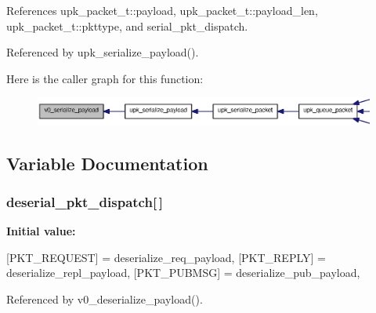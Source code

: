 References upk\_\-packet\_\-t::payload, upk\_\-packet\_\-t::payload\_\-len, upk\_\-packet\_\-t::pkttype, and serial\_\-pkt\_\-dispatch.



Referenced by upk\_\-serialize\_\-payload().



Here is the caller graph for this function:
\nopagebreak
\begin{figure}[H]
\begin{center}
\leavevmode
\includegraphics[width=400pt]{upk__v0__protocol__serializer_8c_ae79e7dbcde1fd7e12de6b1a44d213bf8_icgraph}
\end{center}
\end{figure}




\subsection{Variable Documentation}
\subsubsection[{deserial\_\-pkt\_\-dispatch}]{ {\bf deserial\_\-pkt\_\-dispatch}[$\,$]\hspace{0.3cm}{\ttfamily  [static]}}\label{upk__v0__protocol__serializer_8c_a8d51ace6d3825228de0e34cc69f7f306}
{\bfseries Initial value:}
\begin{DoxyCode}
 {
    [PKT_REQUEST] = deserialize_req_payload,
    [PKT_REPLY] = deserialize_repl_payload,
    [PKT_PUBMSG] = deserialize_pub_payload,
}
\end{DoxyCode}


Referenced by v0\_\-deserialize\_\-payload().

